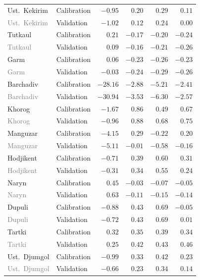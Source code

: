 \begin{longtable}{llrrrr}
\addlinespace
Ust.\  Kekirim & Calibration & $-0.95$ & $0.20$ & $0.29$ & $0.11$ \\
\textcolor{gray}{Ust.\  Kekirim} & Validation & $-1.02$ & $0.12$ & $0.24$ & $0.00$ \\
\addlinespace
Tutkaul & Calibration & $0.21$ & $-0.17$ & $-0.20$ & $-0.24$ \\
\textcolor{gray}{Tutkaul} & Validation & $0.09$ & $-0.16$ & $-0.21$ & $-0.26$ \\
\addlinespace
Garm & Calibration & $0.06$ & $-0.23$ & $-0.26$ & $-0.23$ \\
\textcolor{gray}{Garm} & Validation & $-0.03$ & $-0.24$ & $-0.29$ & $-0.26$ \\
\addlinespace
Barchadiv & Calibration & $-28.16$ & $-2.88$ & $-5.21$ & $-2.41$ \\
\textcolor{gray}{Barchadiv} & Validation & $-30.94$ & $-3.53$ & $-6.30$ & $-2.57$ \\
\addlinespace
Khorog & Calibration & $-1.67$ & $0.86$ & $0.49$ & $0.67$ \\
\textcolor{gray}{Khorog} & Validation & $-0.96$ & $0.88$ & $0.68$ & $0.75$ \\
\addlinespace
Manguzar & Calibration & $-4.15$ & $0.29$ & $-0.22$ & $0.20$ \\
\textcolor{gray}{Manguzar} & Validation & $-5.11$ & $-0.01$ & $-0.58$ & $-0.16$ \\
\addlinespace
Hodjikent & Calibration & $-0.71$ & $0.39$ & $0.60$ & $0.31$ \\
\textcolor{gray}{Hodjikent} & Validation & $-0.31$ & $0.34$ & $0.55$ & $0.24$ \\
\addlinespace
Naryn & Calibration & $0.45$ & $-0.03$ & $-0.07$ & $-0.05$ \\
\textcolor{gray}{Naryn} & Validation & $0.63$ & $-0.11$ & $-0.15$ & $-0.14$ \\
\addlinespace
Dupuli & Calibration & $-0.88$ & $0.43$ & $0.69$ & $-0.05$ \\
\textcolor{gray}{Dupuli} & Validation & $-0.72$ & $0.43$ & $0.69$ & $0.01$ \\
\addlinespace
Tartki & Calibration & $0.32$ & $0.35$ & $0.39$ & $0.34$ \\
\textcolor{gray}{Tartki} & Validation & $0.25$ & $0.42$ & $0.43$ & $0.46$ \\
\addlinespace
Ust.\  Djumgol & Calibration & $-0.99$ & $0.33$ & $0.42$ & $0.23$ \\
\textcolor{gray}{Ust.\  Djumgol} & Validation & $-0.66$ & $0.23$ & $0.34$ & $0.14$ \\

\end{longtable}
